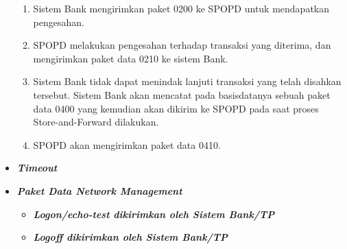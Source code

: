 \begin{itemize}
  \begin{enumerate}[1.]
    \item Sistem Bank mengirimkan paket 0200 ke SPOPD untuk mendapatkan pengesahan.
    \item SPOPD melakukan pengesahan terhadap transaksi yang diterima, dan mengirimkan paket data 0210 ke sistem Bank.
    \item Sistem Bank tidak dapat menindak lanjuti transaksi yang telah disahkan tersebut. Sistem Bank akan mencatat pada basisdatanya sebuah paket data 0400 yang kemudian akan dikirim ke SPOPD pada saat proses Store-and-Forward dilakukan.
    \item SPOPD akan mengirimkan paket data 0410.
  \end{enumerate}
  
  \item \textbf{\textit{Timeout}}
  
  \item \textbf{\textit{Paket Data Network Management}}
  
  \begin{itemize}
    \item \textbf{\textit{Logon/echo-test dikirimkan oleh Sistem Bank/TP}}
    \item \textbf{\textit{Logoff dikirimkan oleh Sistem Bank/TP}}
  \end{itemize}

\end{itemize}